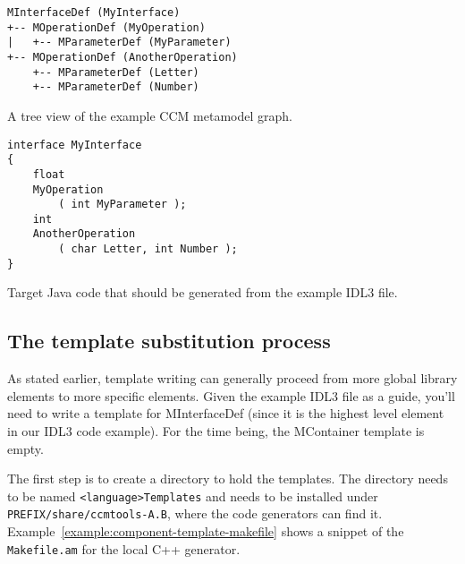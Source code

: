 \begin{Example}
\begin{minifbox}
\begin{small}
\begin{verbatim}
MInterfaceDef (MyInterface)
+-- MOperationDef (MyOperation)
|   +-- MParameterDef (MyParameter)
+-- MOperationDef (AnotherOperation)
    +-- MParameterDef (Letter)
    +-- MParameterDef (Number)
\end{verbatim}
\end{small}
\end{minifbox}
\caption{A tree view of the example CCM metamodel graph.}
\label{example:component-parse-tree}
\end{Example}

\begin{Example}
\begin{minifbox}
\begin{small}
\begin{verbatim}
interface MyInterface
{
    float
    MyOperation
        ( int MyParameter );
    int
    AnotherOperation
        ( char Letter, int Number );
}
\end{verbatim}
\end{small}
\end{minifbox}
\caption{Target Java code that should be generated from the example IDL3 file.}
\label{example:component-generated-java}
\end{Example}

\subsection{The template substitution process}

As stated earlier, template writing can generally proceed from more global
library elements to more specific elements. Given the example IDL3 file as a
guide, you'll need to write a template for MInterfaceDef (since it is the
highest level element in our IDL3 code example). For the time being, the
MContainer template is empty.

The first step is to create a directory to hold the templates. The directory
needs to be named {\tt <language>Templates} and needs to be installed under {\tt
PREFIX/share/ccmtools-A.B}, where the code generators can find it.
Example~\ref{example:component-template-makefile} shows a snippet of the {\tt
Makefile.am} for the local C++ generator.

